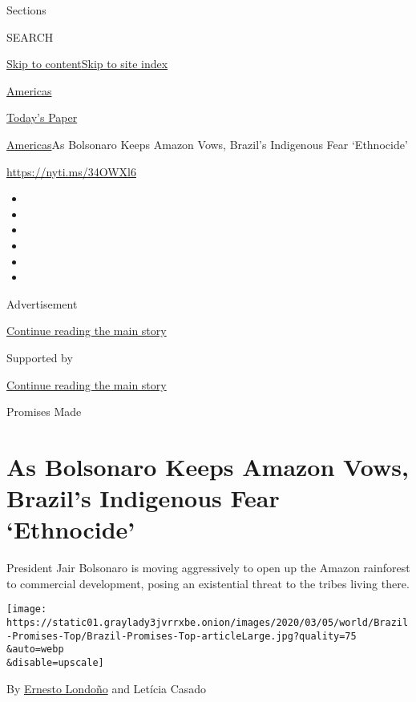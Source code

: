 Sections

SEARCH

\protect\hyperlink{site-content}{Skip to
content}\protect\hyperlink{site-index}{Skip to site index}

\href{https://www.nytimes3xbfgragh.onion/section/world/americas}{Americas}

\href{https://myaccount.nytimes3xbfgragh.onion/auth/login?response_type=cookie\&client_id=vi}{}

\href{https://www.nytimes3xbfgragh.onion/section/todayspaper}{Today's
Paper}

\href{/section/world/americas}{Americas}\textbar{}As Bolsonaro Keeps
Amazon Vows, Brazil's Indigenous Fear `Ethnocide'

\url{https://nyti.ms/34OWXl6}

\begin{itemize}
\item
\item
\item
\item
\item
\item
\end{itemize}

Advertisement

\protect\hyperlink{after-top}{Continue reading the main story}

Supported by

\protect\hyperlink{after-sponsor}{Continue reading the main story}

Promises Made

\hypertarget{as-bolsonaro-keeps-amazon-vows-brazils-indigenous-fear-ethnocide}{%
\section{As Bolsonaro Keeps Amazon Vows, Brazil's Indigenous Fear
`Ethnocide'}\label{as-bolsonaro-keeps-amazon-vows-brazils-indigenous-fear-ethnocide}}

President Jair Bolsonaro is moving aggressively to open up the Amazon
rainforest to commercial development, posing an existential threat to
the tribes living there.

\texttt{[image: https://static01.graylady3jvrrxbe.onion/images/2020/03/05/world/Brazil-Promises-Top/Brazil-Promises-Top-articleLarge.jpg?quality=75\\\&auto=webp\\\&disable=upscale]}

By \href{https://www.nytimes3xbfgragh.onion/by/ernesto-londono}{Ernesto
Londoño} and Letícia Casado

